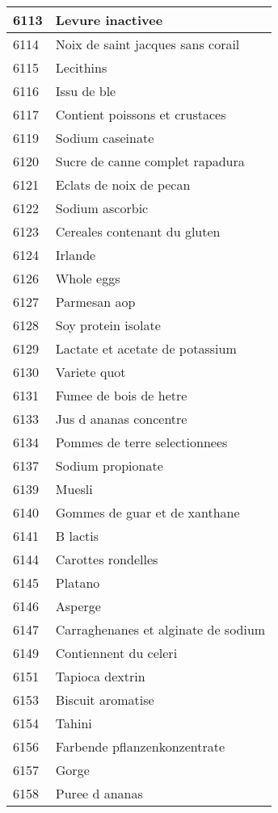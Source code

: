\begin{longtable}{|l|l|}
6113 & Levure inactivee \\ \hline 
6114 & Noix de saint jacques sans corail \\ \hline 
6115 & Lecithins \\ \hline 
6116 & Issu de ble \\ \hline 
6117 & Contient poissons et crustaces \\ \hline 
6119 & Sodium caseinate \\ \hline 
6120 & Sucre de canne complet rapadura \\ \hline 
6121 & Eclats de noix de pecan \\ \hline 
6122 & Sodium ascorbic \\ \hline 
6123 & Cereales contenant du gluten \\ \hline 
6124 & Irlande \\ \hline 
6126 & Whole eggs \\ \hline 
6127 & Parmesan aop \\ \hline 
6128 & Soy protein isolate \\ \hline 
6129 & Lactate et acetate de potassium \\ \hline 
6130 & Variete quot \\ \hline 
6131 & Fumee de bois de hetre \\ \hline 
6133 & Jus d ananas concentre \\ \hline 
6134 & Pommes de terre selectionnees \\ \hline 
6137 & Sodium propionate \\ \hline 
6139 & Muesli \\ \hline 
6140 & Gommes de guar et de xanthane \\ \hline 
6141 & B lactis \\ \hline 
6144 & Carottes rondelles \\ \hline 
6145 & Platano \\ \hline 
6146 & Asperge \\ \hline 
6147 & Carraghenanes et alginate de sodium \\ \hline 
6149 & Contiennent du celeri \\ \hline 
6151 & Tapioca dextrin \\ \hline 
6153 & Biscuit aromatise \\ \hline 
6154 & Tahini \\ \hline 
6156 & Farbende pflanzenkonzentrate \\ \hline 
6157 & Gorge \\ \hline 
6158 & Puree d ananas \\ \hline 

\end{longtable}
